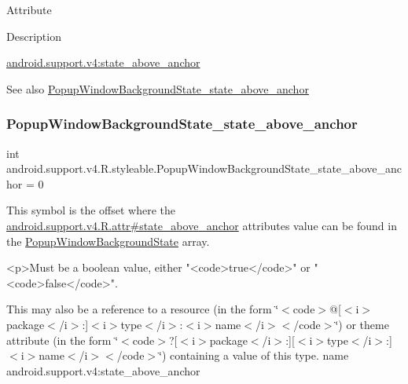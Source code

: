 Attribute

Description 

{\ttfamily \hyperlink{classandroid_1_1support_1_1v4_1_1R_1_1styleable_aa2ce1f64d9e7308599d8ec1ae0bb9d70}{android.\+support.\+v4\+:state\+\_\+above\+\_\+anchor}}

\begin{DoxySeeAlso}{See also}
\hyperlink{classandroid_1_1support_1_1v4_1_1R_1_1styleable_aa2ce1f64d9e7308599d8ec1ae0bb9d70}{Popup\+Window\+Background\+State\+\_\+state\+\_\+above\+\_\+anchor} 
\end{DoxySeeAlso}
\mbox{\label{classandroid_1_1support_1_1v4_1_1R_1_1styleable_aa2ce1f64d9e7308599d8ec1ae0bb9d70}} 
\subsubsection{\texorpdfstring{Popup\+Window\+Background\+State\+\_\+state\+\_\+above\+\_\+anchor}{PopupWindowBackgroundState\_state\_above\_anchor}}
{\footnotesize\ttfamily int android.\+support.\+v4.\+R.\+styleable.\+Popup\+Window\+Background\+State\+\_\+state\+\_\+above\+\_\+anchor = 0\hspace{0.3cm}{\ttfamily [static]}}

This symbol is the offset where the \hyperlink{classandroid_1_1support_1_1v4_1_1R_1_1attr_aa2c47414936c3a0a1beddb34c7bd2fa5}{android.\+support.\+v4.\+R.\+attr\#state\+\_\+above\+\_\+anchor} attribute\textquotesingle{}s value can be found in the \hyperlink{classandroid_1_1support_1_1v4_1_1R_1_1styleable_a20b84169baa4a240ced79c4184411680}{Popup\+Window\+Background\+State} array.

\begin{DoxyVerb}      <p>Must be a boolean value, either "<code>true</code>" or "<code>false</code>".
\end{DoxyVerb}
 

This may also be a reference to a resource (in the form \char`\"{}$<$code$>$@\mbox{[}$<$i$>$package$<$/i$>$\+:\mbox{]}$<$i$>$type$<$/i$>$\+:$<$i$>$name$<$/i$>$$<$/code$>$\char`\"{}) or theme attribute (in the form \char`\"{}$<$code$>$?\mbox{[}$<$i$>$package$<$/i$>$\+:\mbox{]}\mbox{[}$<$i$>$type$<$/i$>$\+:\mbox{]}$<$i$>$name$<$/i$>$$<$/code$>$\char`\"{}) containing a value of this type.  name android.\+support.\+v4\+:state\+\_\+above\+\_\+anchor \mbox{\label{classandroid_1_1support_1_1v4_1_1R_1_1styleable_ad60a429c2c839e07a58e4212d7ffeba0}} 

